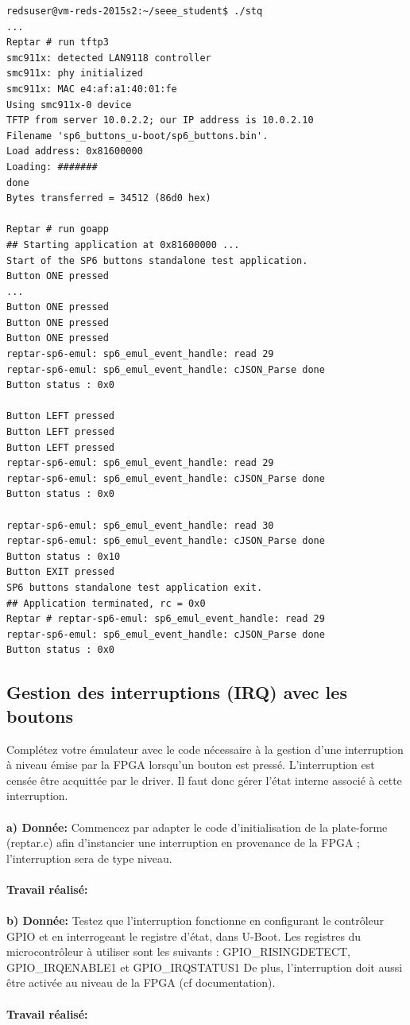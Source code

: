 \begin{lstlisting}
redsuser@vm-reds-2015s2:~/seee_student$ ./stq
...
Reptar # run tftp3
smc911x: detected LAN9118 controller
smc911x: phy initialized
smc911x: MAC e4:af:a1:40:01:fe
Using smc911x-0 device
TFTP from server 10.0.2.2; our IP address is 10.0.2.10
Filename 'sp6_buttons_u-boot/sp6_buttons.bin'.
Load address: 0x81600000
Loading: #######
done
Bytes transferred = 34512 (86d0 hex)

Reptar # run goapp
## Starting application at 0x81600000 ...
Start of the SP6 buttons standalone test application.
Button ONE pressed
...
Button ONE pressed
Button ONE pressed
Button ONE pressed
reptar-sp6-emul: sp6_emul_event_handle: read 29 
reptar-sp6-emul: sp6_emul_event_handle: cJSON_Parse done 
Button status : 0x0

Button LEFT pressed
Button LEFT pressed
Button LEFT pressed
reptar-sp6-emul: sp6_emul_event_handle: read 29 
reptar-sp6-emul: sp6_emul_event_handle: cJSON_Parse done 
Button status : 0x0

reptar-sp6-emul: sp6_emul_event_handle: read 30 
reptar-sp6-emul: sp6_emul_event_handle: cJSON_Parse done 
Button status : 0x10
Button EXIT pressed
SP6 buttons standalone test application exit.
## Application terminated, rc = 0x0
Reptar # reptar-sp6-emul: sp6_emul_event_handle: read 29 
reptar-sp6-emul: sp6_emul_event_handle: cJSON_Parse done 
Button status : 0x0
\end{lstlisting}
\subsection{Gestion des interruptions (IRQ) avec les boutons}
Complétez votre émulateur avec le code nécessaire à la gestion d'une interruption à niveau émise par
la FPGA lorsqu'un bouton est pressé. L'interruption est censée être acquittée par le driver. Il faut donc
gérer l'état interne associé à cette interruption. \\\\
\textbf{a) Donnée: }Commencez par adapter le code d'initialisation de la plate-forme (reptar.c) afin d'instancier une
interruption en provenance de la FPGA ; l'interruption sera de type niveau.\\\\
\textbf{Travail réalisé: }\\\\
\textbf{b) Donnée: }Testez que l'interruption fonctionne en configurant le contrôleur GPIO et en interrogeant le registre
d'état, dans U-Boot. Les registres du microcontrôleur à utiliser sont les suivants :
GPIO\_RISINGDETECT, GPIO\_IRQENABLE1 et GPIO\_IRQSTATUS1
De plus, l'interruption doit aussi être activée au niveau de la FPGA (cf documentation). \\\\
\textbf{Travail réalisé: }\\\\
